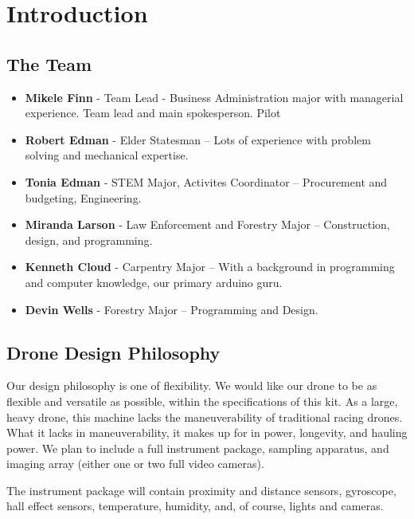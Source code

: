 
\section{Introduction}

\subsection{The Team}
\begin{itemize}
    \item \textbf{Mikele Finn} - Team Lead - Business Administration major with managerial experience. Team lead and main spokesperson. Pilot
    \item \textbf{Robert Edman} - Elder Statesman -- Lots of experience with problem solving and mechanical expertise.
    \item \textbf{Tonia Edman} - STEM Major, Activites Coordinator -- Procurement and budgeting, Engineering.
    \item \textbf{Miranda Larson} - Law Enforcement and Forestry Major -- Construction, design, and programming.
    \item \textbf{Kenneth Cloud} - Carpentry Major -- With a background in programming and computer knowledge, our primary arduino guru.
    \item \textbf{Devin Wells} - Forestry Major -- Programming and Design.
\end{itemize}


\subsection{Drone Design Philosophy}

Our design philosophy is one of flexibility. We would like our drone to be as flexible and versatile as possible, within the specifications of this kit. As a large, heavy drone, this machine lacks the maneuverability of traditional racing drones. What it lacks in maneuverability, it makes up for in power, longevity, and hauling power. We plan to include a full instrument package, sampling apparatus, and imaging array (either one or two full video cameras).

The instrument package will contain proximity and distance sensors, gyroscope, hall effect sensors, temperature, humidity, and, of course, lights and cameras.

